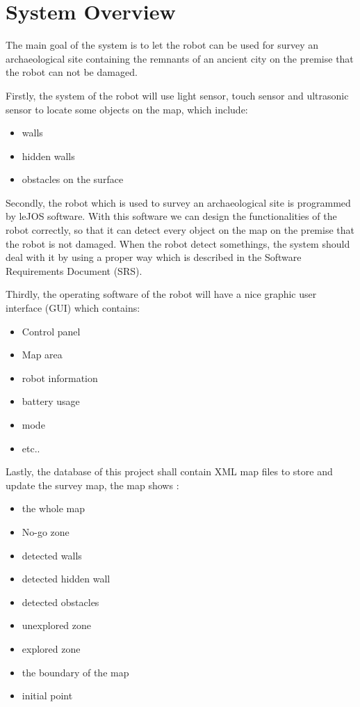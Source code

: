 \documentclass[11pt, a4paper]{report}
\begin{document}
\chapter{System Overview}%
\label{cha:SO}
The main goal of the system is to let the robot can be used for survey an archaeological site containing the remnants of an ancient city on the premise that the robot can not be damaged.
\par\vspace{\baselineskip}
\par\vspace{\baselineskip}
 Firstly, the system of the robot will use light sensor, touch sensor and ultrasonic sensor to locate some objects on the map, which include:
\begin{itemize}
  \item walls
  \item hidden walls 
  \item obstacles on the surface
\end{itemize}
Secondly, the robot which is used to survey an archaeological site is programmed by leJOS software. With this software we can design the functionalities of the robot correctly, so that it can detect every object on the map on the premise that the robot is not damaged. When the robot detect somethings, the system should deal with it by using a proper way which is described in the Software Requirements Document (SRS).
\par\vspace{\baselineskip}
\par\vspace{\baselineskip}
Thirdly, the operating software of the robot will have a nice graphic user interface (GUI) which contains:
\begin{itemize}
  \item Control panel
  \item Map area
  \item robot information
  \item battery usage
  \item mode
  \item etc..
\end{itemize}
Lastly, the database of this project shall contain XML map files to store and update the survey map, the map shows :
\begin{itemize}
  \item the whole map
  \item No-go zone
  \item detected walls
  \item detected hidden wall
  \item detected obstacles
  \item unexplored zone
  \item explored zone
  \item the boundary of the map
  \item initial point
\end{itemize}
\end{document}

